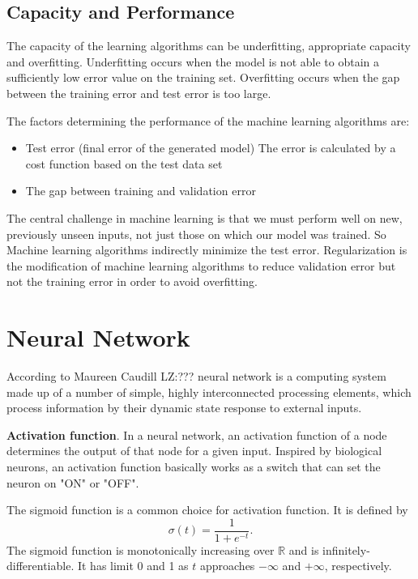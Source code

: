 	\subsection{Capacity and Performance}	

	The capacity of the learning algorithms can be underfitting, appropriate capacity and overfitting. Underfitting occurs when the model is not able to obtain a sufficiently low error value on the training set. Overfitting occurs when the gap between the training error and test error is too large.
	
	The factors determining the performance of the machine learning algorithms are:
	\begin{itemize}
		\item Test error (final error of the generated model) The error is calculated by a cost function based on the test data set
		\item The gap between training and validation error
	\end{itemize}
	The central challenge in machine learning is that we must perform well on new, previously unseen inputs, not just those on which our model was trained. So Machine learning algorithms indirectly minimize the test error. Regularization is the modification of machine learning algorithms to reduce validation error but not the training error in order to avoid overfitting.
	
\section{Neural Network}
According to Maureen Caudill{\color{red} LZ:???} neural network is a computing system made up of a number of simple, highly interconnected processing elements, which process information by their dynamic state response to external inputs.


{\bf Activation function}. In a neural network, an activation function of a node determines the output of that node for a given input. Inspired by biological neurons, an activation function basically works as a switch that can set the neuron on "ON" or "OFF".

The sigmoid function is a common choice for activation function. It is defined by
\begin{equation}
\sigma(t) = \frac{1}{1+e^{-t}}.
\end{equation}
The sigmoid function is monotonically increasing over $\mathbb{R}$ and is infinitely-differentiable. It has limit 0 and 1 as $t$ approaches $-\infty$ and $+\infty$, respectively.

